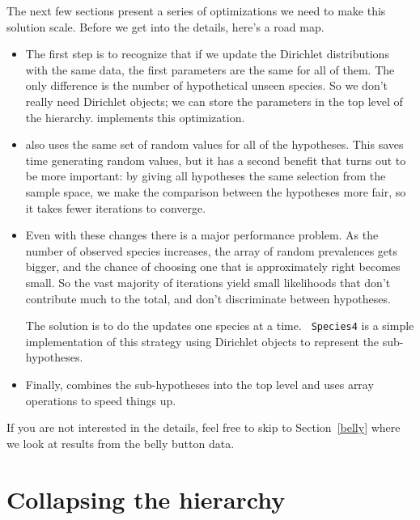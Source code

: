 \documentclass[12pt]{book}
\theoremstyle{exercise}
\begin{document}
The next few sections present a series of optimizations we need to
make this solution scale.  Before we get into the details, here's
a road map.

\begin{itemize}

\item The first step is to recognize that if we update the Dirichlet
  distributions with the same data, the first  parameters are
  the same for all of them.  The only difference is the number of
  hypothetical unseen species.  So we don't really need 
  Dirichlet objects; we can store the parameters in the top level of
  the hierarchy.   implements this optimization.

\item {} also uses the same set of random values for all
  of the hypotheses.  This saves time generating random values, but it
  has a second benefit that turns out to be more important: by giving
  all hypotheses the same selection from the sample space, we make
  the comparison between the hypotheses more fair, so it takes
  fewer iterations to converge.

\item Even with these changes there is a major performance problem.
  As the number of observed species increases, the array of random
  prevalences gets bigger, and the chance of choosing one that is
  approximately right becomes small.  So the vast majority of
  iterations yield small likelihoods that don't contribute much to the
  total, and don't discriminate between hypotheses.

  The solution is to do the updates one species at a time.  {\tt
  Species4} is a simple implementation of this strategy using
  Dirichlet objects to represent the sub-hypotheses.

\item Finally,  combines the sub-hypotheses into the top
  level and uses  array operations to speed things up.

\end{itemize}

If you are not interested in the details, feel free to skip to
Section~\ref{belly} where we look at results from the belly
button data.


\section{Collapsing the hierarchy}
\label{collapsing}
\end{document}
